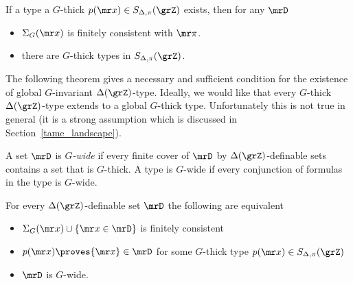 \begin{corollary}\label{corol_def_mu}
  If a type a $G$-thick $p({\mr x})\in S_{\Delta,\pi}(\grZ)$ exists, then for any $\mrD$
  \begin{itemize}
    \item[1.] $\Sigma_G({\mr x})$ is finitely consistent with ${\mr\pi}$.
    \item[2.] there are $G$-thick types in $S_{\Delta,\pi}(\grZ)$.\smallskip
  \end{itemize}
\end{corollary}


The following theorem gives a necessary and sufficient condition for the  existence of global $G$-invariant $\Delta(\grZ)$-type.
Ideally, we would like that every $G$-thick $\Delta(\grZ)$-type extends to a global $G$-thick type.
Unfortunately this is not true in general (it is a strong assumption which is discussed in Section~\ref{tame_landscape}).

A set $\mrD$ is \emph{$G$-wide\/} if every finite cover of $\mrD$ by $\Delta(\grZ)$-definable sets contains a set that is $G$-thick.
A type is $G$-wide if every conjunction of formulas in the type is $G$-wide.


\begin{theorem}\label{thm_syndetic_invariant2}
  For every $\Delta(\grZ)$-definable set $\mrD$ the following are equivalent 
  \begin{itemize}
    \item[1.] $\Sigma_G({\mr x})\cup\{{\mr x}\in\mrD\}$ is finitely consistent
    \item[2.] $p({\mr x})\proves {\mr x}\in\mrD$ for some $G$-thick type $p({\mr x})\in S_{\Delta,\pi}(\grZ)$
    \item[3.] $\mrD$ is $G$-wide.\smallskip
  \end{itemize}
\end{theorem}

